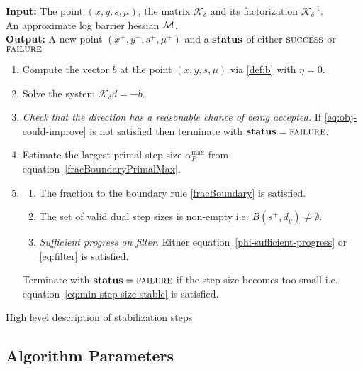 \documentclass{article}
\begin{document}
\begin{algorithm}[H]
\textbf{Input:} The point $(x,y,s, \mu)$, the matrix $\mathcal{K}_{\delta}$ and its factorization $\mathcal{K}_{\delta}^{-1}$. \\ An approximate log barrier hessian $\mathcal{M}$. \\
\textbf{Output:} A new point $(x^{+}, y^{+}, s^{+}, \mu^{+})$ and a $\textbf{status}$ of either $\textsc{success}$ or $\textsc{failure}$
\begin{enumerate}[label*=A.{\arabic*}]
\item Compute the vector $b$ at the point $(x,y,s, \mu)$ via \eqref{def:b} with $\eta = 0$.
\item Solve the system $\mathcal{K}_{\delta} d = -b$.
\item \emph{Check that the direction has a reasonable chance of being accepted.} If \eqref{eq:obj-could-improve} is not satisfied then terminate with $\textbf{status} = \textsc{failure}$.
\item Estimate the largest primal step size $\alpha^{\max}_{P}$ from equation~\eqref{fracBoundaryPrimalMax}.
\item \backtrackBlurb \label{line:sbl-backtrack}
\begin{enumerate}[label=({\roman*})] 
\item The fraction to the boundary rule \eqref{fracBoundary} is satisfied.
\item The set of valid dual step sizes is non-empty i.e. $B( s^{+}, d_{y} ) \neq \emptyset$.
\item \emph{Sufficient progress on filter.} Either equation~\eqref{phi-sufficient-progress} or \eqref{eq:filter} is satisfied.
\end{enumerate}
Terminate with $\textbf{status} = \textsc{failure}$ if the step size becomes too small i.e. equation~\eqref{eq:min-step-size-stable} is satisfied.
\end{enumerate}
\caption{High level description of stabilization steps}\label{alg:stable}
\end{algorithm}






\subsection{Algorithm Parameters}
\end{document}

